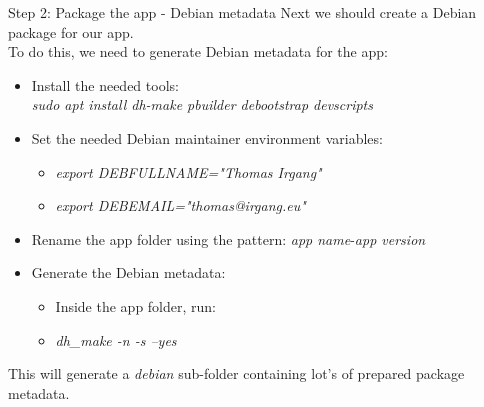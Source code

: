 \documentclass{beamer}
\begin{document}
\begin{frame}{Step 2: Package the app - Debian metadata}
	Next we should create a Debian package for our app.\\
	To do this, we need to generate Debian metadata for the app:
	\begin{itemize}
		\item Install the needed tools:\\
		\emph{sudo apt install dh-make pbuilder debootstrap devscripts}
		\item Set the needed Debian maintainer environment variables:
		\begin{itemize}
			\item \emph{export DEBFULLNAME="Thomas Irgang"}
			\item \emph{export DEBEMAIL="thomas@irgang.eu"}
		\end{itemize}
		\item Rename the app folder using the pattern: \emph{app name}-\emph{app version}
		\item Generate the Debian metadata:
		\begin{itemize}
			\item Inside the app folder, run:
			\item \emph{dh\_make -n -s --yes}
		\end{itemize}
	\end{itemize}
	This will generate a \emph{debian} sub-folder containing lot's of prepared package metadata.
\end{frame}
\end{document}
